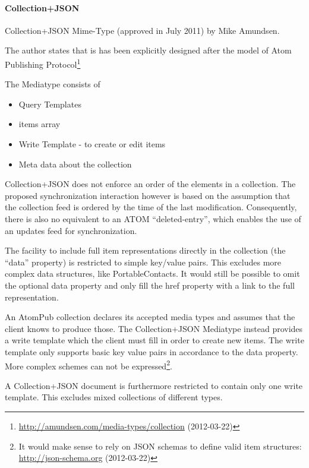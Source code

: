 \documentclass[12pt,a4paper,twoside]{scrartcl}		%
\newcommand{\citeurl}[2]{\url{#1} (#2)}
\begin{document}
\paragraph{Collection+JSON}
\label{sec:collection+json}


Collection+JSON Mime-Type (approved in July 2011) by Mike Amundsen\cite{Amundsen2011a}\cite[ch. 3]{amundsen2011building}.

The author states that is has been explicitly designed after the model of Atom Publishing
Protocol\footnote{\citeurl{http://amundsen.com/media-types/collection}{2012-03-22}}

The Mediatype consists of

\begin{itemize}
\item Query Templates
\item items array
\item Write Template - to create or edit items
\item Meta data about the collection

\end{itemize}



Collection+JSON does not enforce an order of the elements in a collection. The
proposed synchronization interaction however is based on the assumption that the
collection feed is ordered by the time of the last modification. Consequently,
there is also no equivalent to an ATOM
``deleted-entry''\cite{draft-snell-atompub-tombstones-14}, which enables the use
of an updates feed for synchronization.

The facility to include full item representations directly in the collection
(the ``data'' property) is restricted to simple key/value pairs. This excludes
more complex data structures, like PortableContacts. It would still be possible
to omit the optional data property and only fill the href property with a link
to the full representation.

An AtomPub collection declares its accepted media types and assumes that the
client knows to produce those. The Collection+JSON Mediatype instead provides a
write template which the client must fill in order to create new items. The
write template only supports basic key value pairs in accordance to the data
property. More complex schemes can not be expressed\footnote{It would make sense
  to rely on JSON schemas to define valid item structures:
  \citeurl{http://json-schema.org}{2012-03-22}}.

A Collection+JSON document is furthermore restricted to contain only one write
template. This excludes mixed collections of different types.
\end{document}
